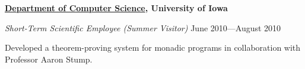 \documentclass[10pt]{article}
\newenvironment{outerlist}[1][\enskip\textbullet]%
        {\begin{itemize}[#1]}{\end{itemize}%
         \vspace{-.6\baselineskip}}
\newenvironment{innerlist}[1][\enskip\textbullet]%
        {\begin{compactitem}[#1]}{\end{compactitem}}
\newcommand{\blankline}{\quad\pagebreak[2]}
\begin{document}
\blankline

\textbf{\href{http://www.cs.uiowa.edu/}{Department of Computer Science}, University of Iowa}
\begin{outerlist}
\item[] \textit{Short-Term Scientific Employee (Summer Visitor)} \hfill June 2010---August 2010
        \begin{innerlist}
        \item Developed a theorem-proving system for monadic programs in collaboration with Professor Aaron Stump.
        \end{innerlist}
\end{outerlist}






\end{document}
